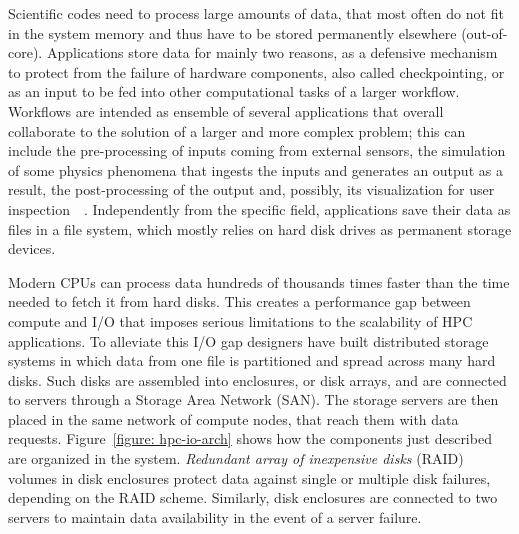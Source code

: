 Scientific codes need to process large amounts of data, that most often do not fit in the system memory and thus have to be stored permanently elsewhere (out-of-core). Applications store data for mainly two reasons, as 
a defensive mechanism to protect from the failure of hardware components, also called checkpointing, or as an input to be fed into other computational tasks of a larger workflow. Workflows are intended as ensemble of several 
applications that overall collaborate to the solution of a larger and more complex problem; this can include the pre-processing of inputs coming from external sensors, the simulation of some physics phenomena that ingests 
the inputs and generates an output as a result, the post-processing of the output and, possibly, its visualization for user inspection~\cite{Fryxell2000}~\cite{Markidis2010}. Independently from the specific field, applications 
save their data as files in a file system, which mostly relies on hard disk drives as permanent storage devices. 

Modern CPUs can process data hundreds of thousands times faster than the time needed to fetch it from hard disks. This creates a performance gap between compute and I/O that imposes serious limitations to the 
scalability of HPC applications. To alleviate this I/O gap designers have built distributed storage systems in which data from one file is partitioned and spread across many hard disks. Such disks are assembled into 
enclosures, or disk arrays, and are connected to servers through a Storage Area Network (SAN). The storage servers are then placed in the same network of compute nodes, that reach them with data requests. 
Figure~\ref{figure: hpc-io-arch} shows how the components just described are organized in the system. \textit{Redundant array of inexpensive disks} (RAID)~\cite{Patterson1988} volumes in disk enclosures protect data against single or 
multiple disk failures, depending on the RAID scheme. Similarly, disk enclosures are connected to two servers to maintain data availability in the event of a server failure.

